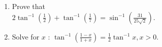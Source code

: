 \begin{enumerate}
\item Prove that \\
$2\tan^{-1}{(\frac{1}{2})} + \tan^{-1}{(\frac{1}{7})} = \sin^{-1}{(\frac{31}{25\sqrt{2}})}$.

\item Solve for $x$ : $\tan^{-1}{(\frac{1-x}{1+x})}= \frac{1}{2} \tan^{-1}{x} , x>0$.
\end{enumerate}
